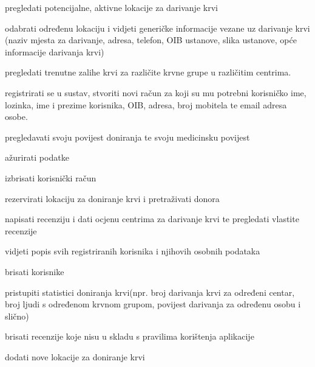 			
			\begin{packed_enum}
				\item  {}
				    
				\begin{packed_enum}
					
					\item pregledati potencijalne, aktivne lokacije za darivanje krvi
					\item odabrati određenu lokaciju i vidjeti generičke informacije vezane uz darivanje krvi (naziv mjesta za darivanje, adresa, telefon, OIB ustanove, slika ustanove, opće informacije darivanja krvi)
					\item pregledati trenutne zalihe krvi za različite krvne grupe u različitim centrima.
					\item registrirati se u sustav, stvoriti novi račun za koji su mu potrebni korisničko ime, lozinka, ime i prezime korisnika, OIB, adresa, broj mobitela te email adresa osobe.
				\end{packed_enum}
			
				\item  {}
				
				\begin{packed_enum}
					
					\item pregledavati svoju povijest doniranja te svoju medicinsku povijest
					\item ažurirati podatke
					\item izbrisati korisnički račun
					\item rezervirati lokaciju za doniranje krvi i pretraživati donora
					\item napisati recenziju i dati ocjenu centrima za darivanje krvi te pregledati vlastite recenzije
				\end{packed_enum}
    
                    \item  {}
				
				\begin{packed_enum}
					
					\item vidjeti popis svih registriranih korisnika i njihovih osobnih podataka
					\item brisati korisnike
					\item pristupiti statistici doniranja krvi(npr. broj darivanja krvi za određeni centar, broj ljudi s određenom krvnom grupom, povijest darivanja za određenu osobu i slično)
					\item brisati recenzije koje nisu u skladu s pravilima korištenja aplikacije
					\item dodati nove lokacije za doniranje krvi
					

\end{packed_enum}
\end{packed_enum}
